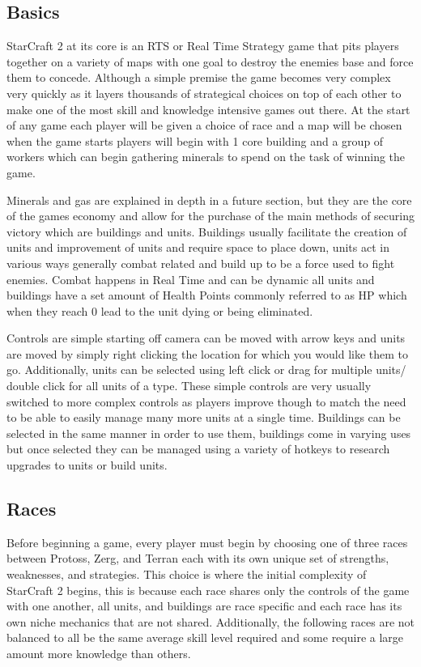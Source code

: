 \documentclass[a4paper,12pt]{report}
\begin{document}
\subsection{Basics}

StarCraft 2 at its core is an RTS or Real Time Strategy game that pits players together on a variety of maps with one goal to destroy the enemies base and force them to concede. Although a simple premise the game becomes very complex very quickly as it layers thousands of strategical choices on top of each other to make one of the most skill and knowledge intensive games out there. At the start of any game each player will be given a choice of race and a map will be chosen when the game starts players will begin with 1 core building and a group of workers which can begin gathering minerals to spend on the task of winning the game.

Minerals and gas are explained in depth in a future section, but they are the core of the games economy and allow for the purchase of the main methods of securing victory which are buildings and units. Buildings usually facilitate the creation of units and improvement of units and require space to place down, units act in various ways generally combat related and build up to be a force used to fight enemies. Combat happens in Real Time and can be dynamic all units and buildings have a set amount of Health Points commonly referred to as HP which when they reach 0 lead to the unit dying or being eliminated.

Controls are simple starting off camera can be moved with arrow keys and units are moved by simply right clicking the location for which you would like them to go. Additionally, units can be selected using left click or drag for multiple units/ double click for all units of a type. These simple controls are very usually switched to more complex controls as players improve though to match the need to be able to easily manage many more units at a single time. Buildings can be selected in the same manner in order to use them, buildings come in varying uses but once selected they can be managed using a variety of hotkeys to research upgrades to units or build units.

\subsection{Races}

Before beginning a game, every player must begin by choosing one of three races between Protoss, Zerg, and Terran each with its own unique set of strengths, weaknesses, and strategies. This choice is where the initial complexity of StarCraft 2 begins, this is because each race shares only the controls of the game with one another, all units, and buildings are race specific and each race has its own niche mechanics that are not shared. Additionally, the following races are not balanced to all be the same average skill level required and some require a large amount more knowledge than others.
\end{document}
